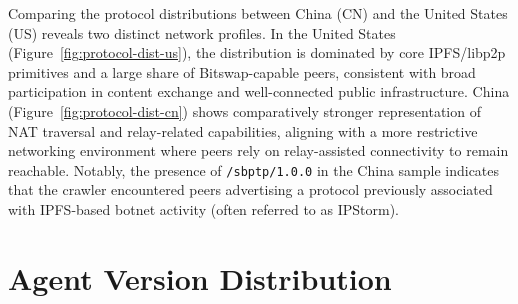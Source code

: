 \documentclass[10pt,a4paper,twocolumn]{article}
\begin{document}
Comparing the protocol distributions between China (CN) and the United States (US) reveals two distinct network profiles. In the United States (Figure~\ref{fig:protocol-dist-us}), the distribution is dominated by core IPFS/libp2p primitives and a large share of Bitswap-capable peers, consistent with broad participation in content exchange and well-connected public infrastructure. China (Figure~\ref{fig:protocol-dist-cn}) shows comparatively stronger representation of NAT traversal and relay-related capabilities, aligning with a more restrictive networking environment where peers rely on relay-assisted connectivity to remain reachable.
Notably, the presence of \texttt{/sbptp/1.0.0} in the China sample indicates that the crawler encountered peers advertising a protocol previously associated with IPFS-based botnet activity (often referred to as IPStorm). 
\mbox{} %

\section{Agent Version Distribution}
\end{document}
